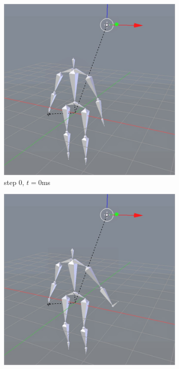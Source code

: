 \documentclass[10pt,twocolumn,letterpaper]{article}
\begin{document}
\begin{figure}[]
    \centering
    \begin{subfigure}{0.2\textwidth}
        \centering
        \includegraphics[width=.9\linewidth]{raise-circ-0.jpg}
        \caption{step 0, $t=0$ms}
    \end{subfigure}\begin{subfigure}{0.2\textwidth}
        \centering
        \includegraphics[width=.9\linewidth]{raise-circ-1.jpg}

\end{subfigure}
\end{figure}
\end{document}
